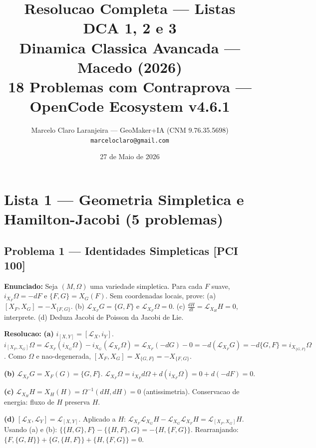 \documentclass[12pt,a4paper,oneside]{article}
\begin{document}
\title{\textbf{Resolucao Completa — Listas DCA 1, 2 e 3}\\
\large Dinamica Classica Avancada — Macedo (2026)\\
\large 18 Problemas com Contraprova — OpenCode Ecosystem v4.6.1}
\author{Marcelo Claro Laranjeira — GeoMaker+IA (CNM 9.76.35.5698)\\
\texttt{marceloclaro@gmail.com}}
\date{27 de Maio de 2026}
\maketitle

\section{Lista 1 — Geometria Simpletica e Hamilton-Jacobi (5 problemas)}

\subsection{Problema 1 — Identidades Simpleticas [PCI 100]}
\textbf{Enunciado:} Seja $(M,\Omega)$ uma variedade simpletica. Para cada $F$ suave,
$i_{X_F}\Omega=-dF$ e $\{F,G\}=X_G(F)$. Sem coordenadas locais, prove:
(a) $[X_F,X_G]=-X_{\{F,G\}}$.
(b) $\mathcal{L}_{X_F}G=\{G,F\}$ e $\mathcal{L}_{X_F}\Omega=0$.
(c) $\frac{dH}{dt}=\mathcal{L}_{X_H}H=0$, interprete.
(d) Deduza Jacobi de Poisson da Jacobi de Lie.

\textbf{Resolucao:}
\textbf{(a)} $i_{[X,Y]}=[\mathcal{L}_X,i_Y]$. $i_{[X_F,X_G]}\Omega=\mathcal{L}_{X_F}(i_{X_G}\Omega)-i_{X_G}(\mathcal{L}_{X_F}\Omega)=
\mathcal{L}_{X_F}(-dG)-0=-d(\mathcal{L}_{X_F}G)=-d\{G,F\}=i_{X_{\{G,F\}}}\Omega$.
Como $\Omega$ e nao-degenerada, $[X_F,X_G]=X_{\{G,F\}}=-X_{\{F,G\}}$.

\textbf{(b)} $\mathcal{L}_{X_F}G=X_F(G)=\{G,F\}$. $\mathcal{L}_{X_F}\Omega=i_{X_F}d\Omega+d(i_{X_F}\Omega)=0+d(-dF)=0$.

\textbf{(c)} $\mathcal{L}_{X_H}H=X_H(H)=\Omega^{-1}(dH,dH)=0$ (antissimetria). Conservacao de energia: fluxo de $H$ preserva $H$.

\textbf{(d)} $[\mathcal{L}_X,\mathcal{L}_Y]=\mathcal{L}_{[X,Y]}$. Aplicado a $H$:
$\mathcal{L}_{X_F}\mathcal{L}_{X_G}H-\mathcal{L}_{X_G}\mathcal{L}_{X_F}H=\mathcal{L}_{[X_F,X_G]}H$.
Usando (a) e (b): $\{\{H,G\},F\}-\{\{H,F\},G\}=-\{H,\{F,G\}\}$. Rearranjando: $\{F,\{G,H\}\}+\{G,\{H,F\}\}+\{H,\{F,G\}\}=0$.
\end{document}
